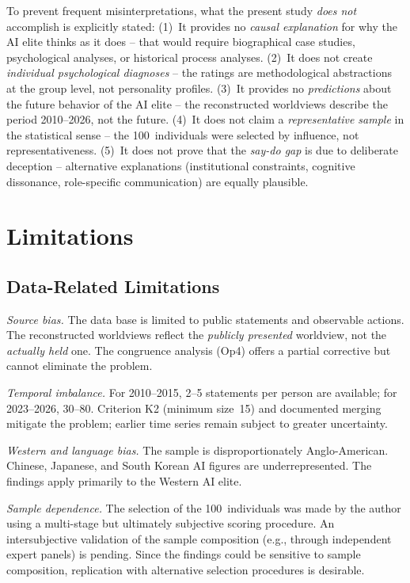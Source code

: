 \documentclass[12pt,a4paper]{article}
\begin{document}
To prevent frequent misinterpretations, what the present study \emph{does not} accomplish is explicitly stated: (1)~It provides no \emph{causal explanation} for why the AI elite thinks as it does -- that would require biographical case studies, psychological analyses, or historical process analyses. (2)~It does not create \emph{individual psychological diagnoses} -- the ratings are methodological abstractions at the group level, not personality profiles. (3)~It provides no \emph{predictions} about the future behavior of the AI elite -- the reconstructed worldviews describe the period 2010--2026, not the future. (4)~It does not claim a \emph{representative sample} in the statistical sense -- the 100~individuals were selected by influence, not representativeness. (5)~It does not prove that the \emph{say-do gap} is due to deliberate deception -- alternative explanations (institutional constraints, cognitive dissonance, role-specific communication) are equally plausible.


\section{Limitations}
\label{sec:limitationen}

\subsection{Data-Related Limitations}

\emph{Source bias.} The data base is limited to public statements and observable actions. The reconstructed worldviews reflect the \emph{publicly presented} worldview, not the \emph{actually held} one. The congruence analysis (Op4) offers a partial corrective but cannot eliminate the problem.

\emph{Temporal imbalance.} For 2010--2015, 2--5 statements per person are available; for 2023--2026, 30--80. Criterion K2 (minimum size~15) and documented merging mitigate the problem; earlier time series remain subject to greater uncertainty.

\emph{Western and language bias.} The sample is disproportionately Anglo-American. Chinese, Japanese, and South Korean AI figures are underrepresented. The findings apply primarily to the Western AI elite.

\emph{Sample dependence.} The selection of the 100~individuals was made by the author using a multi-stage but ultimately subjective scoring procedure. An intersubjective validation of the sample composition (e.g., through independent expert panels) is pending. Since the findings could be sensitive to sample composition, replication with alternative selection procedures is desirable.
\end{document}
